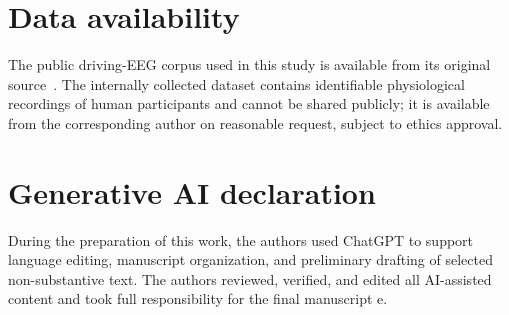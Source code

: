 \documentclass[preprint,review,12pt,number,sort&compress]{elsarticle}
\begin{document}
\section*{Data availability}
The public driving-EEG corpus used in this study is available from its original
source~\citep{cao2019multichannel}. The internally collected dataset contains
identifiable physiological recordings of human participants and cannot be
shared publicly; it is available from the corresponding author on reasonable
request, subject to ethics approval.

\section*{Generative AI declaration}

During the preparation of this work, the authors used ChatGPT to support language editing, manuscript organization, and
preliminary drafting of selected non-substantive text. The authors reviewed, verified, and edited all AI-assisted content and
took full responsibility for the final manuscript
e.


\appendix




\end{document}
